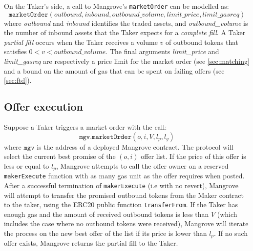 \documentclass[12pt]{extarticle}
\begin{document}
On the Taker's side, a call to Mangrove's \texttt{marketOrder} can be modelled as:
$$
\mathtt{marketOrder}(\mathit{outbound}, \mathit{inbound}, \mathit{outbound\_volume}, \mathit{limit\_price}, \mathit{limit\_gasreq})
$$
where \emph{outbound} and \emph{inbound} identifies the traded assets, and \emph{outbound\_volume} is the number of inbound assets that the Taker expects for a \emph{complete fill}. A Taker \emph{partial fill} occurs when the Taker receives a volume $v$ of outbound tokens that satisfies $0<v<\mathit{outbound\_volume}$. The final arguments \emph{limit\_price} and \emph{limit\_gasreq} are respectively a price limit for the market order (see \autoref{sec:matching} and a bound on the amount of gas that can be spent on failing offers (see \autoref{sec:ftd}). 

\subsection{Offer execution}\label{sec:matching}
Suppose a Taker triggers a market order with the call: 
$$
\mathtt{mgv.marketOrder}(o,i,V,l_p,l_g)
$$
where $\mathtt{mgv}$ is the address of a deployed Mangrove contract. The protocol will select the current best promise of the $(o,i)$ offer list. If the price of this offer is less or equal to $l_p$, Mangrove attempts to call the offer owner on a reserved \texttt{makerExecute} function with as many gas unit as the offer requires when posted. After a successful termination of \texttt{makerExecute} (i.e with no revert), Mangrove will attempt to transfer the promised outbound tokens from the Maker contract to the taker, using the ERC20 public function \texttt{transferFrom}. If the Taker has enough gas and the amount of received outbound tokens is less than $V$ (which includes the case where no outbound tokens were received), Mangrove will iterate the process on the new best offer of the list if its price is lower than $l_p$. If no such offer exists, Mangrove returns the partial fill to the Taker.  
\end{document}

